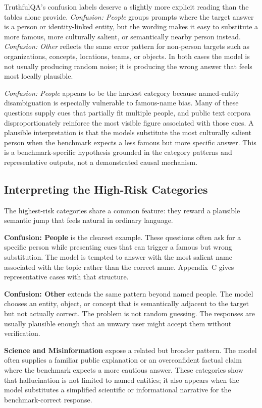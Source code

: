 \documentclass[conference]{IEEEtran}
\begin{document}
TruthfulQA's confusion labels deserve a slightly more explicit reading than the tables alone provide. \textit{Confusion: People} groups prompts where the target answer is a person or identity-linked entity, but the wording makes it easy to substitute a more famous, more culturally salient, or semantically nearby person instead. \textit{Confusion: Other} reflects the same error pattern for non-person targets such as organizations, concepts, locations, teams, or objects. In both cases the model is not usually producing random noise; it is producing the wrong answer that feels most locally plausible.

\textit{Confusion: People} appears to be the hardest category because named-entity disambiguation is especially vulnerable to famous-name bias. Many of these questions supply cues that partially fit multiple people, and public text corpora disproportionately reinforce the most visible figure associated with those cues. A plausible interpretation is that the models substitute the most culturally salient person when the benchmark expects a less famous but more specific answer. This is a benchmark-specific hypothesis grounded in the category patterns and representative outputs, not a demonstrated causal mechanism.

\subsection{\textbf{Interpreting the High-Risk Categories}}

The highest-risk categories share a common feature: they reward a plausible semantic jump that feels natural in ordinary language.

\textbf{Confusion: People} is the clearest example. These questions often ask for a specific person while presenting cues that can trigger a famous but wrong substitution. The model is tempted to answer with the most salient name associated with the topic rather than the correct name. Appendix~C gives representative cases with that structure.

\textbf{Confusion: Other} extends the same pattern beyond named people. The model chooses an entity, object, or concept that is semantically adjacent to the target but not actually correct. The problem is not random guessing. The responses are usually plausible enough that an unwary user might accept them without verification.

\textbf{Science and Misinformation} expose a related but broader pattern. The model often supplies a familiar public explanation or an overconfident factual claim where the benchmark expects a more cautious answer. These categories show that hallucination is not limited to named entities; it also appears when the model substitutes a simplified scientific or informational narrative for the benchmark-correct response.
\end{document}
